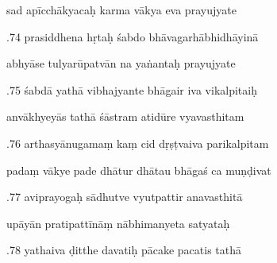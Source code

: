 \documentclass[article,12pt,a4paper]{memoir}%
\newcounter{parCount}
\begin{document}
	  
	  \pstart \leavevmode%
	sad apīcchākyacaḥ karma vākya eva prayujyate 
	{}
	\pend%
      

	  
	  \pstart {}.74 prasiddhena hṛtaḥ śabdo   bhāvagarhābhidhāyinā 
	{}
	\pend%
      

	  
	  \pstart \leavevmode%
	abhyāse tulyarūpatvān na yaṅantaḥ prayujyate 
	{}
	\pend%
      

	  
	  \pstart {}.75 śabdā yathā vibhajyante bhāgair iva vikalpitaiḥ 
	{}
	\pend%
      

	  
	  \pstart \leavevmode%
	anvākhyeyās tathā śāstram atidūre vyavasthitam 
	{}
	\pend%
      

	  
	  \pstart {}.76 arthasyānugamaṃ kaṃ cid dṛṣṭvaiva parikalpitam 
	{}
	\pend%
      

	  
	  \pstart \leavevmode%
	padaṃ vākye pade dhātur dhātau bhāgaś ca muṇḍivat 
	{}
	\pend%
      

	  
	  \pstart {}.77 aviprayogaḥ sādhutve vyutpattir anavasthitā 
	{}
	\pend%
      

	  
	  \pstart \leavevmode%
	upāyān pratipattīnāṃ nābhimanyeta satyataḥ 
	{}
	\pend%
      

	  
	  \pstart {}.78 yathaiva ḍitthe davatiḥ pācake pacatis tathā 
	{}
	\pend%
      
\end{document}
